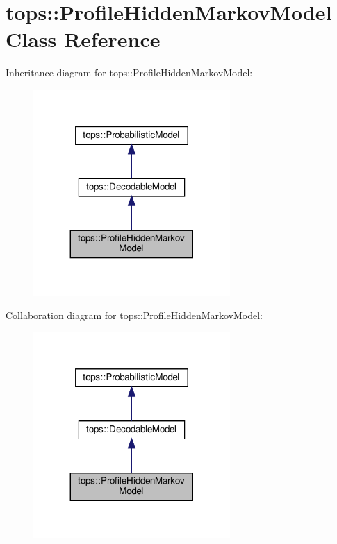 \hypertarget{classtops_1_1ProfileHiddenMarkovModel}{}\section{tops\+:\+:Profile\+Hidden\+Markov\+Model Class Reference}
\label{classtops_1_1ProfileHiddenMarkovModel}


Inheritance diagram for tops\+:\+:Profile\+Hidden\+Markov\+Model\+:
\nopagebreak
\begin{figure}[H]
\begin{center}
\leavevmode
\includegraphics[width=212pt]{classtops_1_1ProfileHiddenMarkovModel__inherit__graph}
\end{center}
\end{figure}


Collaboration diagram for tops\+:\+:Profile\+Hidden\+Markov\+Model\+:
\nopagebreak
\begin{figure}[H]
\begin{center}
\leavevmode
\includegraphics[width=212pt]{classtops_1_1ProfileHiddenMarkovModel__coll__graph}
\end{center}
\end{figure}
